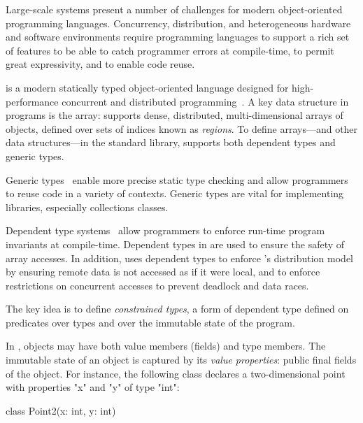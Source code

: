 
Large-scale systems present a number of challenges for modern
object-oriented programming languages.  Concurrency,
distribution, and heterogeneous hardware and software
environments require programming languages to support a rich set
of features to be able to catch programmer errors at
compile-time, to permit great expressivity, and to enable code
reuse.

\Xten{} is a modern statically typed object-oriented language
designed for high-performance concurrent and distributed
programming~\cite{X10}.  A key data structure in \Xten{} programs
is the array: \Xten{} supports
dense,
distributed, multi-dimensional arrays of objects,
defined over sets of indices known as {\em regions}.
%
To define arrays---and other data structures---in the
\Xten{} standard library, \Xten{} supports both dependent types and
generic types. 

Generic
types~\cite{clu,ada,GJ,java-popl97,thorup97,Java3,csharp-generics}
enable more precise static type checking and allow programmers
to reuse code in a variety of contexts.  Generic types are vital
for implementing libraries, especially collections classes.

Dependent type
systems~\cite{dependent-types,xi99dependent,ocrz-ecoop03,aspinall-attapl,cayenne,epigram-matter,calc-constructions}
allow programmers to enforce run-time program invariants at
compile-time.
Dependent types in \Xten{} are used to
ensure the safety of array accesses.
In addition,
\Xten{} uses dependent types to enforce \Xten{}'s
distribution model by ensuring remote data is
not accessed as if it were local, and to enforce
restrictions on concurrent accesses to prevent deadlock and data
races.

The key idea is to define \emph{constrained types}, a form of
dependent type defined on predicates over types and over the
immutable state of the program.

In \Xten{}, objects may have both value members (fields)
and type members.
The immutable state of an object is captured by its
\emph{value properties}: public final fields of the object.
For instance, the following class declares a two-dimensional
point with properties \xcd"x" and \xcd"y" of type \xcd"int":
\begin{xten}
class Point2(x: int, y: int) { }
\end{xten}

